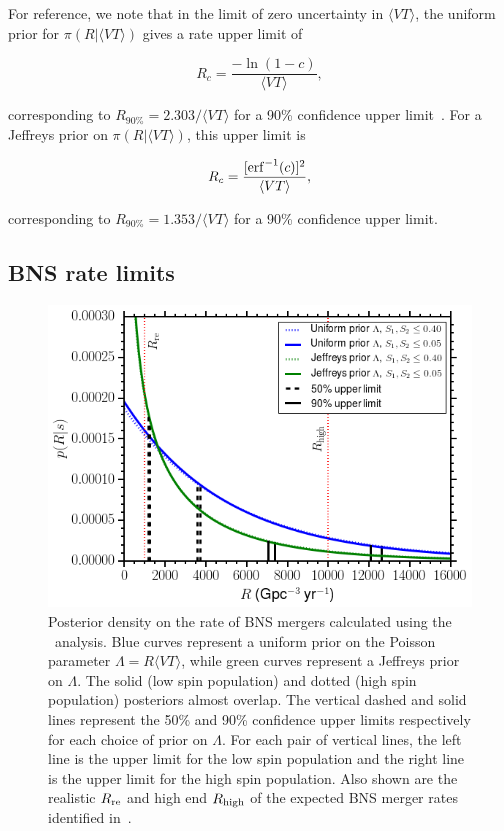 For reference, we note that in the limit of zero uncertainty in $\langle VT \rangle$,
the uniform prior for $\pi(R | \langle VT \rangle)$ gives a rate upper limit of
%
\begin{linenomath*}
\begin{equation}
R_c = \frac{ -\ln(1-c) }{ \langle VT \rangle },
\end{equation}
\end{linenomath*}
%
corresponding to $R_{90\%} = 2.303/\langle VT \rangle$ for a 90\% confidence upper
limit~\citep{Biswas:2007ni}. For a Jeffreys prior on $\pi(R | \langle VT \rangle)$, this upper limit is
%
\begin{linenomath*}
\begin{equation}
R_c = \frac{ [{\rm erf}^{-1}(c)]^2 }{ \langle VT \rangle },
\end{equation}
\end{linenomath*}
%
corresponding to $R_{90\%} = 1.353/\langle VT \rangle$ for a 90\% confidence upper limit.


\subsection{BNS rate limits}
\label{ssec:bns_rate_limits}

\begin{figure}[t]
   \centering
   \includegraphics[width=\columnwidth]{figs/chapter3/figure3.png} 
   \caption{Posterior density on the rate of \ac{BNS} mergers calculated using the \pycbc\ analysis.
   Blue curves represent
   a uniform prior on the Poisson parameter $\Lambda = R \langle VT \rangle$, while
   green curves represent a Jeffreys prior on $\Lambda$. The solid (low spin population)
   and dotted (high spin population) posteriors almost overlap. The vertical dashed and
   solid lines represent the 50\% and 90\% confidence upper limits respectively for each
   choice of prior on $\Lambda$. For each pair of vertical lines, the left line is the 
   upper limit for the low spin population and the right line is the upper limit for the high
   spin population. Also shown are the realistic $R_{\rm re}$ and high end
   $R_{\rm high}$ of the expected \ac{BNS} merger rates identified in~\citep{Abadie:2010cf}.}
   \label{fig:bnspdf}
\end{figure}


